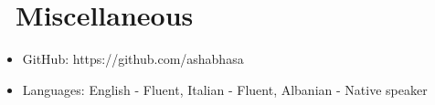 \documentclass{resume}
\begin{document}
\section{\faInfo\ Miscellaneous}
\begin{itemize}[parsep=0.5ex]
  \item GitHub: https://github.com/ashabhasa
  \item Languages: English - Fluent, Italian - Fluent, Albanian - Native speaker
\end{itemize}

%
%
\end{document}
